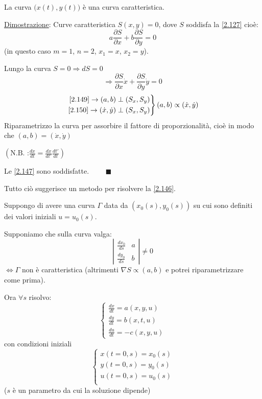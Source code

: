 \documentclass[a4paper,11pt]{report}
\begin{document}
\medskip

La curva $\big(x(t),y(t)\big)$ \`e una curva caratteristica.

\underline{Dimostrazione}: Curve caratteristica $S(x,y)=0$, dove $S$ soddisfa la \eqref{2.127} cio\`e:
\begin{equation}
a\frac{\partial S}{\partial x} + b\frac{\partial S}{\partial y}=0
\label{2.149}
\end{equation}
(in questo caso $m=1$, $n=2$, $x_1=x$, $x_2=y$).

Lungo la curva $S=0 \Rightarrow dS=0 $
\begin{equation}
\Rightarrow \frac{\partial S}{\partial x}\dot{x}+\frac{\partial S}{\partial y}\dot{y} =0
\label{2.150}
\end{equation}
\[
\left.
\begin{aligned}
\eqref{2.149} \rightarrow (a,b) \perp (S_x,S_y)\\
\eqref{2.150} \rightarrow (\dot{x},\dot{y}) \perp (S_x,S_y)\\
\end{aligned}
\right\}(a,b)\propto (\dot{x},\dot{y})
\]
Riparametrizzo la curva per assorbire il fattore di proporzionalit\`a, cio\`e in modo che $(a,b)=(\dot{x},\dot{y})$ 

$\left( \text{N.B. :} \frac{dx}{dt}=\frac{dx}{dt'}\frac{dt'}{dt}\right)$

Le \eqref{2.147} sono soddisfatte. $\qquad \blacksquare$

\medskip

Tutto ci\`o suggerisce un metodo per risolvere la \eqref{2.146}.

Suppongo di avere una curva $\Gamma$ data da $(x_0(s),y_0(s))$ su cui sono definiti dei valori iniziali $u=u_0(s)$.

Supponiamo che sulla curva valga:
\begin{equation}
\left|\begin{matrix}
\frac{dx_0}{ds} & a \\
\frac{dy_0}{ds} & b
\end{matrix}\right|\neq 0
\label{2.151}
\end{equation}
$\Leftrightarrow \Gamma$ non \`e caratteristica (altrimenti $\nabla S \propto (a,b)$ e potrei riparametrizzare come prima).

Ora $\forall s$ risolvo: 
\begin{equation}
\begin{cases}
\frac{dx}{dt}=a(x,y,u) \\
\frac{dy}{dt}=b(x,t,u) \\
\frac{du}{dt}=-c(x,y,u)
\end{cases}
\label{2.152}
\end{equation}
con condizioni iniziali
\begin{equation}
\begin{cases}
x(t=0,s)=x_0(s) \\
y(t=0,s)=y_0(s) \\
u(t=0,s)=u_0(s) \\
\end{cases}
\label{2.153}
\end{equation}
($s$ \`e un parametro da cui la soluzione dipende)
\end{document}
